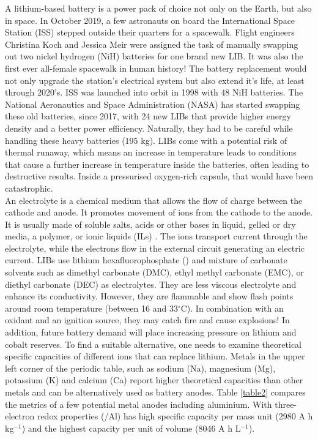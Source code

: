 A lithium-based battery is a power pack of choice not only on the Earth, but also in space. In October 2019, a few astronauts on board the International Space Station (ISS) stepped outside their quarters for a spacewalk. Flight engineers Christina Koch and Jessica Meir were assigned the task of manually swapping out two nickel hydrogen (NiH) batteries for one brand new LIB. It was also the first ever all-female spacewalk in human history! The battery replacement would not only upgrade the station's electrical system but also extend it's life, at least through 2020's. ISS was launched into orbit in 1998 with 48 NiH batteries. The National Aeronautics and Space Administration (NASA) has started swapping these old batteries, since 2017, with 24 new LIBs  that provide higher energy density and a better power efficiency. Naturally, they had to be careful while handling these heavy batteries (195 kg). LIBs come with a potential risk of thermal runaway, which means an increase in temperature leads to conditions that cause a further increase in temperature inside the batteries, often leading to destructive results. Inside a pressurised oxygen-rich capsule, that would have been catastrophic.\\
An electrolyte is a chemical medium that allows the flow of charge between the cathode and anode. It promotes movement of ions from the cathode to the anode. It is usually made of soluble salts, acids or other bases in liquid, gelled or dry media, a polymer, or ionic liquids (ILs) \cite{xu_nonaqueous_2004,armand_ionic-liquid_2009,croce_nanocomposite_1998}. The ions transport current through the electrolyte, while the electrons flow in the external circuit generating an electric current. LIBs use lithium hexafluorophosphate () and mixture of carbonate solvents such as dimethyl carbonate (DMC), ethyl methyl carbonate (EMC), or diethyl carbonate (DEC) as electrolytes. They are less viscous electrolyte and enhance its conductivity. However, they are flammable and show flash points around room temperature (between 16 and 33$^{\circ}$C). In combination with an oxidant and an ignition source, they may catch fire and cause explosions! In addition, future battery demand will place increasing pressure on lithium and cobalt reserves\cite{turcheniuk_ten_2018}. To find a suitable alternative, one needs to examine theoretical specific capacities of different ions that can replace lithium. Metals in the upper left corner of the periodic table, such as sodium (Na), magnesium (Mg), potassium (K) and calcium (Ca) report higher theoretical capacities than other metals and can be alternatively used as battery anodes. Table  \ref{table2} compares the metrics of a few potential metal anodes including aluminium. With three-electron redox properties (/Al) has high specific capacity per mass unit (2980 A h kg$^{-1}$) and the highest capacity per unit of volume (8046 A h L$^{-1}$)\cite{ambroz_trends_2017}.

